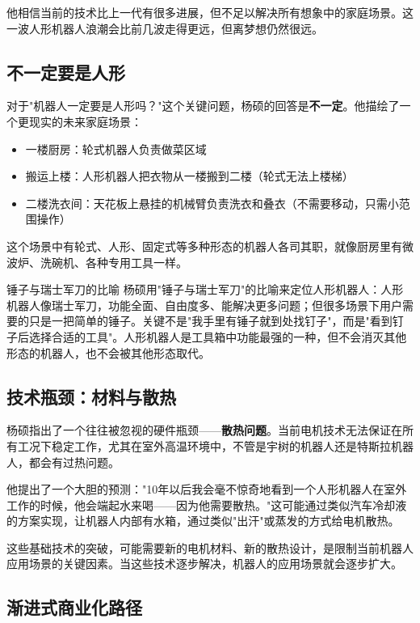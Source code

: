 \documentclass[a4paper]{article}
\begin{document}
他相信当前的技术比上一代有很多进展，但不足以解决所有想象中的家庭场景。这一波人形机器人浪潮会比前几波走得更远，但离梦想仍然很远。

\subsection{不一定要是人形}

对于"机器人一定要是人形吗？"这个关键问题，杨硕的回答是\textbf{不一定}。他描绘了一个更现实的未来家庭场景：

\begin{itemize}
    \item 一楼厨房：轮式机器人负责做菜区域
    \item 搬运上楼：人形机器人把衣物从一楼搬到二楼（轮式无法上楼梯）
    \item 二楼洗衣间：天花板上悬挂的机械臂负责洗衣和叠衣（不需要移动，只需小范围操作）
\end{itemize}

这个场景中有轮式、人形、固定式等多种形态的机器人各司其职，就像厨房里有微波炉、洗碗机、各种专用工具一样。

\begin{warningbox}{锤子与瑞士军刀的比喻}
杨硕用"锤子与瑞士军刀"的比喻来定位人形机器人：人形机器人像瑞士军刀，功能全面、自由度多、能解决更多问题；但很多场景下用户需要的只是一把简单的锤子。关键不是"我手里有锤子就到处找钉子"，而是"看到钉子后选择合适的工具"。人形机器人是工具箱中功能最强的一种，但不会消灭其他形态的机器人，也不会被其他形态取代。
\end{warningbox}

\subsection{技术瓶颈：材料与散热}

杨硕指出了一个往往被忽视的硬件瓶颈——\textbf{散热问题}。当前电机技术无法保证在所有工况下稳定工作，尤其在室外高温环境中，不管是宇树的机器人还是特斯拉机器人，都会有过热问题。

他提出了一个大胆的预测："10年以后我会毫不惊奇地看到一个人形机器人在室外工作的时候，他会端起水来喝——因为他需要散热。"这可能通过类似汽车冷却液的方案实现，让机器人内部有水箱，通过类似"出汗"或蒸发的方式给电机散热。

这些基础技术的突破，可能需要新的电机材料、新的散热设计，是限制当前机器人应用场景的关键因素。当这些技术逐步解决，机器人的应用场景就会逐步扩大。

\subsection{渐进式商业化路径}
\end{document}
